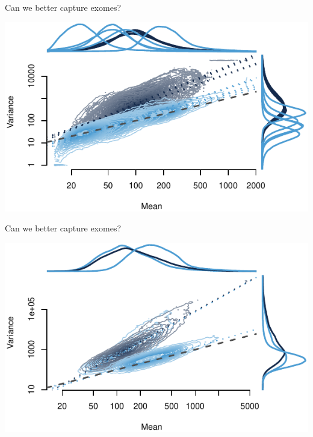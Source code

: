 \documentclass[
  10pt,
  ignorenonframetext,
  m]{beamer}
\begin{document}
\begin{frame}{Can we better capture exomes?}
\protect\hypertarget{can-we-better-capture-exomes-3}{}

\begin{center}\includegraphics{defense_files/figure-beamer/aglMnVr-1} \end{center}

\end{frame}

\begin{frame}{Can we better capture exomes?}
\protect\hypertarget{can-we-better-capture-exomes-4}{}

\begin{center}\includegraphics{defense_files/figure-beamer/idtMnVr-1} \end{center}

\end{frame}
\end{document}
